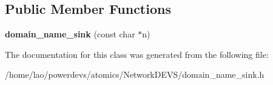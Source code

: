 \subsection*{Public Member Functions}
\begin{DoxyCompactItemize}
\item 
{\bfseries domain\+\_\+name\+\_\+sink} (const char $\ast$n)\hypertarget{classdomain__name__sink_a3e4a6071da63647e596cbe5b855d386d}{}\label{classdomain__name__sink_a3e4a6071da63647e596cbe5b855d386d}

\end{DoxyCompactItemize}


The documentation for this class was generated from the following file\+:\begin{DoxyCompactItemize}
\item 
/home/lao/powerdevs/atomics/\+Network\+D\+E\+V\+S/domain\+\_\+name\+\_\+sink.\+h\end{DoxyCompactItemize}
